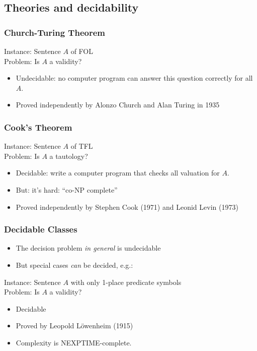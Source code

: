\subsection{Theories and decidability}

\begin{frame}
    \frametitle{Church-Turing Theorem}

\begin{block}{Instance: Sentence $A$ of FOL\\
Problem: Is $A$ a validity?}

\begin{itemize}
\item Undecidable: no computer program can answer this question correctly for all $A$.
\item Proved independently by Alonzo Church and Alan Turing in 1935
\end{itemize}
\end{block}
\end{frame}


\begin{frame}
  \frametitle{Cook's Theorem}

\begin{block}{Instance: Sentence $A$ of TFL\\
Problem: Is $A$ a tautology?}

\begin{itemize}
\item Decidable: write a computer program that checks all valuation for $A$.
\item But: it's hard: ``co-NP complete''
\item Proved independently by Stephen Cook (1971) and Leonid Levin (1973)
\end{itemize}
\end{block}
\end{frame}


\begin{frame}
    \frametitle{Decidable Classes}

\begin{itemize}
\item The decision problem \emph{in general} is undecidable
\item But special cases \emph{can} be decided, e.g.:
\end{itemize}
\begin{block}{Instance: Sentence $A$ with only 1-place predicate symbols\\
Problem: Is $A$ a validity?}

\begin{itemize}
\item Decidable
\item Proved by Leopold L\"owenheim (1915)
\item Complexity is NEXPTIME-complete.
\end{itemize}
\end{block}
\end{frame}

